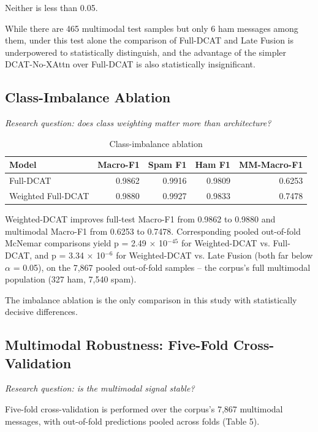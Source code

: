 \documentclass[10pt,twoside]{article}
\begin{document}
Neither is less than 0.05.

While there are 465 multimodal test samples but only 6 ham messages among them, under this test alone the comparison of Full-DCAT and Late Fusion is underpowered to statistically distinguish, and the advantage of the simpler DCAT-No-XAttn over Full-DCAT is also statistically insignificant.

\subsection{Class-Imbalance Ablation}\label{sec:7.4}

\emph{Research question: does class weighting matter more than architecture?}

\begin{table}[t]
\centering
\caption{Class-imbalance ablation}
\label{tab:imbalance}
\small
\begin{tabular}{lrrrr}\toprule
Model & Macro-F1 & Spam F1 & Ham F1 & MM-Macro-F1 \\
\midrule
Full-DCAT & 0.9862 & 0.9916 & 0.9809 & 0.6253 \\
Weighted Full-DCAT & 0.9880 & 0.9927 & 0.9833 & 0.7478 \\
\bottomrule
\end{tabular}

\end{table}

Weighted-DCAT improves full-test Macro-F1 from 0.9862 to 0.9880 and multimodal Macro-F1 from 0.6253 to 0.7478. Corresponding pooled out-of-fold McNemar comparisons yield p = 2.49 $\times$ 10$^{-45}$ for Weighted-DCAT vs. Full-DCAT, and p = 3.34 $\times$ 10$^{-6}$ for Weighted-DCAT vs. Late Fusion (both far below $\alpha$ = 0.05), on the 7,867 pooled out-of-fold samples -- the corpus's full multimodal population (327 ham, 7,540 spam).

The imbalance ablation is the only comparison in this study with statistically decisive differences.

\subsection{Multimodal Robustness: Five-Fold Cross-Validation}\label{sec:7.5}

\emph{Research question: is the multimodal signal stable?}

Five-fold cross-validation is performed over the corpus's 7,867 multimodal messages, with out-of-fold predictions pooled across folds (Table 5).
\end{document}
